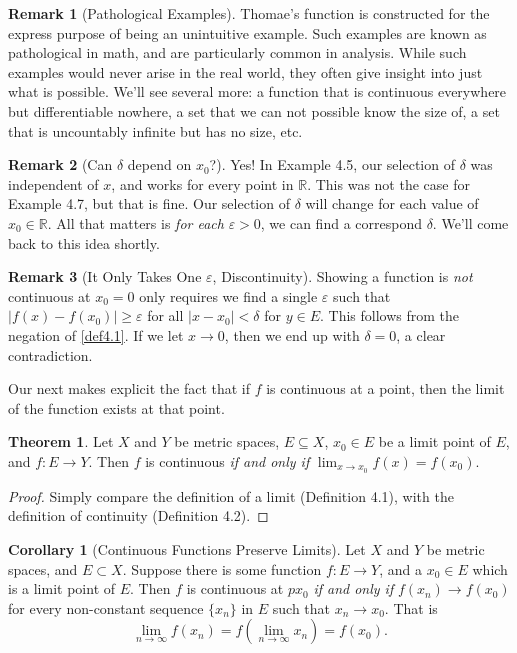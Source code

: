 \documentclass{article}
\newcommand{\R}{\mathbb{R}}
\theoremstyle{definition}
\newtheorem{theorem}{Theorem}[section]
\newtheorem{corollary}{Corollary}[section]
\newtheorem{remark}{Remark}[section]
\begin{document}
	\begin{remark}[Pathological Examples]
		Thomae's function is constructed for the express purpose of being an unintuitive example. Such examples are known as pathological in math, and are particularly common in analysis. While such examples would never arise in the real world, they often give insight into just what is possible. We'll see several more: a function that is continuous everywhere but differentiable nowhere, a set that we can not possible know the size of, a set that is uncountably infinite but has no size, etc. 
	\end{remark}
	\begin{remark}[Can $\delta  $ depend on $x_0$?]
		Yes! In Example 4.5, our selection of $ \delta $ was independent of $ x $, and works for every point in $ \R $. This was not the case for Example 4.7, but that is fine. Our selection of $ \delta $ will change for each value of $ x_0\in\R $. All that matters is \textit{for each} $ \varepsilon>0 $, we can find a correspond $ \delta $. We'll come back to this idea shortly.  
	\end{remark}
	\begin{remark}[It Only Takes One $ \varepsilon $, Discontinuity]
		Showing a function is \textit{not} continuous at $x_0 = 0$ only requires we find a single $ \varepsilon $ such that $ |f(x)-f(x_0)|\ge\varepsilon $ for all $ |x-x_0|<\delta $ for $ y\in E $. This follows from the negation of \cref{def4.1}. If we let $ x\to0 $, then we end up with $ \delta=0 $, a clear contradiction. 
	\end{remark}
	Our next makes explicit the fact that if $ f $ is continuous at a point, then the limit of the function exists at that point.
	\begin{theorem}
		Let $ X $ and $ Y $ be metric spaces,  $ E\subseteq X $, $ x_0 \in E $ be a limit point of $ E $, and $ f:E\to Y $. Then $ f $ is continuous \textit{if and only if} $ \lim_{x\to x_0}f(x)=f(x_0) $.
	\end{theorem}
	\begin{proof}
		Simply compare the definition of a limit (Definition 4.1), with the definition of continuity (Definition 4.2).
	\end{proof}
	\begin{corollary}[Continuous Functions Preserve Limits]
		Let $ X $ and $ Y $ be metric spaces, and $ E\subset X $. Suppose there is some function $ f:E\to Y $, and a $ x_0\in E $ which is a limit point of $ E $. Then $ f $ is continuous at $ px_0$ \textit{if and only if} $ f(x_n)\to f(x_0) $ for every non-constant sequence $ \{x_n\} $ in $ E $ such that $ x_n\to x_0 $. That is $$\lim\limits_{n\to \infty}f(x_n)=f\left(\lim\limits_{n\to\infty} x_n\right)=f(x_0) .$$
	\end{corollary}
\end{document}
